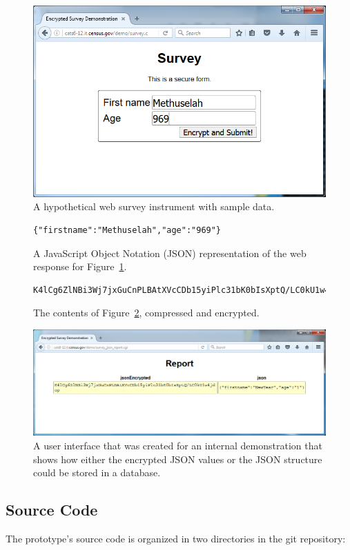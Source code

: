 \documentclass[fleqn,12pt]{wlscirep}
\begin{document}
\begin{figure}
  \centering
  \includegraphics[width=.5\linewidth]{art/figure1}
  \caption{A hypothetical web survey instrument with sample data.}\label{survey}
  \end{figure}

\begin{figure}
  \begin{Verbatim}[frame=single]
    {"firstname":"Methuselah","age":"969"}
  \end{Verbatim}

  \caption{A JavaScript Object Notation (JSON) representation of the web response for Figure~\ref{survey}.}\label{json}
\end{figure}

\begin{figure}
  \begin{Verbatim}[frame=single]
    K4lCg6ZlNBi3Wj7jxGuCnPLBAtXVcCDb15yiPlc31bK0bIsXptQ/LC0kU1w4jdop
  \end{Verbatim}
  \caption{The contents of Figure~\ref{json}, compressed and encrypted.}\label{encrypted}
\end{figure}

\begin{figure}
  \centering
  \includegraphics[width=.5\linewidth]{art/figure3}
  \caption{A user interface that was created for an internal
    demonstration that shows how either the encrypted JSON values or
    the JSON structure could be stored in a database.}\label{figure-demo}
  \end{figure}



\subsection{Source Code}
The prototype's source code is organized in two directories in the git repository:
\end{document}
